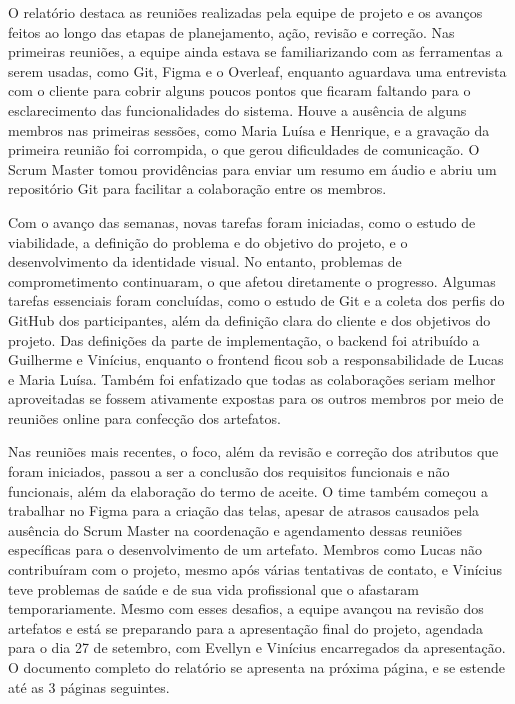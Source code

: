 \hspace{4.5mm}
O relatório destaca as reuniões realizadas pela equipe de projeto e os avanços feitos ao longo das etapas de planejamento, ação, revisão e correção. Nas primeiras reuniões, a equipe ainda estava se familiarizando com as ferramentas a serem usadas, como Git, Figma e o Overleaf, enquanto aguardava uma entrevista com o cliente para cobrir alguns poucos pontos que ficaram faltando para o esclarecimento das funcionalidades do sistema. Houve a ausência de alguns membros nas primeiras sessões, como Maria Luísa e Henrique, e a gravação da primeira reunião foi corrompida, o que gerou dificuldades de comunicação. O Scrum Master tomou providências para enviar um resumo em áudio e abriu um repositório Git para facilitar a colaboração entre os membros.
\par
Com o avanço das semanas, novas tarefas foram iniciadas, como o estudo de viabilidade, a definição do problema e do objetivo do projeto, e o desenvolvimento da identidade visual. No entanto, problemas de comprometimento continuaram, o que afetou diretamente o progresso. Algumas tarefas essenciais foram concluídas, como o estudo de Git e a coleta dos perfis do GitHub dos participantes, além da definição clara do cliente e dos objetivos do projeto. Das definições da parte de implementação, o backend foi atribuído a Guilherme e Vinícius, enquanto o frontend ficou sob a responsabilidade de Lucas e Maria Luísa. Também foi enfatizado que todas as colaborações seriam melhor aproveitadas se fossem ativamente expostas para os outros membros por meio de reuniões online para confecção dos artefatos.
\par
Nas reuniões mais recentes, o foco, além da revisão e correção dos atributos que foram iniciados, passou a ser a conclusão dos requisitos funcionais e não funcionais, além da elaboração do termo de aceite. O time também começou a trabalhar no Figma para a criação das telas, apesar de atrasos causados pela ausência do Scrum Master na coordenação e agendamento dessas reuniões específicas para o desenvolvimento de um artefato. Membros como Lucas não contribuíram com o projeto, mesmo após várias tentativas de contato, e Vinícius teve problemas de saúde e de sua vida profissional que o afastaram temporariamente. Mesmo com esses desafios, a equipe avançou na revisão dos artefatos e está se preparando para a apresentação final do projeto, agendada para o dia 27 de setembro, com Evellyn e Vinícius encarregados da apresentação.
O documento completo do relatório se apresenta na próxima página, e se estende até as 3 páginas seguintes.
